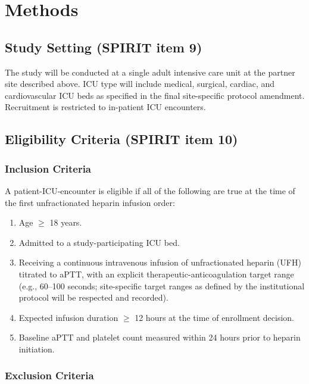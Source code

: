 \documentclass[11pt]{article}
\begin{document}
\section{Methods}
\label{sec:methods}

\subsection{Study Setting (SPIRIT item 9)}

The study will be conducted at a single adult intensive care unit at the partner site described above. ICU type will include medical, surgical, cardiac, and cardiovascular ICU beds as specified in the final site-specific protocol amendment. Recruitment is restricted to in-patient ICU encounters.

\subsection{Eligibility Criteria (SPIRIT item 10)}

\subsubsection{Inclusion Criteria}

A patient-ICU-encounter is eligible if all of the following are true at the time of the first unfractionated heparin infusion order:
\begin{enumerate}
  \item Age $\geq$ 18 years.
  \item Admitted to a study-participating ICU bed.
  \item Receiving a continuous intravenous infusion of unfractionated heparin (UFH) titrated to aPTT, with an explicit therapeutic-anticoagulation target range (e.g., 60--100 seconds; site-specific target ranges as defined by the institutional protocol will be respected and recorded).
  \item Expected infusion duration $\geq$ 12 hours at the time of enrollment decision.
  \item Baseline aPTT and platelet count measured within 24 hours prior to heparin initiation.
\end{enumerate}

\subsubsection{Exclusion Criteria}
\end{document}
